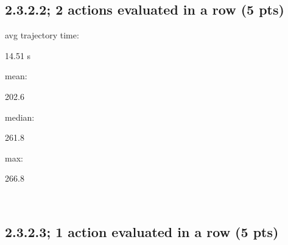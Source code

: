 \documentclass[12pt]{article}
\begin{document}
\subsection*{2.3.2.2; 2 actions evaluated in a row (5 pts)}

avg trajectory time: \begin{tcolorbox}[fit,height=1cm, width=2cm, blank, borderline={1pt}{1pt},nobeforeafter]
    \begin{center}
    \vspace{3mm}
    \large{14.51 s}
    \end{center}
\end{tcolorbox}
mean: \begin{tcolorbox}[fit,height=1cm, width=2cm, blank, borderline={1pt}{1pt},nobeforeafter]
    \begin{center}
    \vspace{3mm}
    \large{202.6}
    \end{center}
\end{tcolorbox}
median: \begin{tcolorbox}[fit,height=1cm, width=2cm, blank, borderline={1pt}{1pt},nobeforeafter]
    \begin{center}
    \vspace{3mm}
    \large{261.8}
    \end{center}
\end{tcolorbox}
max: \begin{tcolorbox}[fit,height=1cm, width=2cm, blank, borderline={1pt}{1pt},nobeforeafter]
    \begin{center}
    \vspace{3mm}
    \large{266.8}
    \end{center}
\end{tcolorbox}
    \\

    
\subsection*{2.3.2.3; 1 action evaluated in a row (5 pts)}
\end{document}
